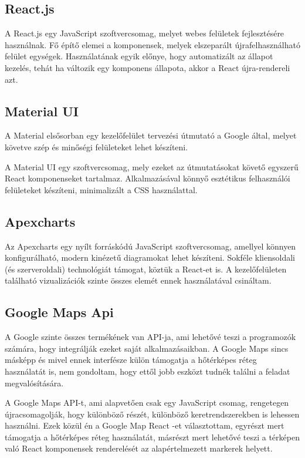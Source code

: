 \subsection{React.js}
A React.js \cite{react} egy JavaScript szoftvercsomag, melyet webes felületek fejlesztésére használnak.
Fő építő elemei a komponensek, melyek elszeparált újrafelhasználható felület egységek.
Használatának egyik előnye, hogy automatizált az állapot kezelés, tehát ha változik egy komponens állapota, akkor a React újra-rendereli azt.

\subsection{Material UI}
A Material \cite{material} elsősorban egy kezelőfelület tervezési útmutató a Google által, melyet követve szép és minőségi felületeket lehet készíteni.

A Material UI \cite{material-ui} egy szoftvercsomag, mely ezeket az útmutatásokat követő egyszerű React komponenseket tartalmaz.
Alkalmazásával könnyő esztétikus felhasználói felületeket készíteni, minimalizált a CSS használattal. 

\subsection{Apexcharts}
Az Apexcharts \cite{apexcharts} egy nyílt forráskódú JavaScript szoftvercsomag, amellyel könnyen konfigurálható, modern kinézetű diagramokat lehet készíteni.
Sokféle kliensoldali (és szerveroldali) technológiát támogat, köztük a React-et is. A kezelőfelületen található vizualizációk szinte összes elemét ennek használatával csináltam.

\subsection{Google Maps Api}
A Google szinte összes termékének van API-ja, ami lehetővé teszi a programozók számára, hogy integrálják ezeket saját alkalmazásaikban.
A Google Maps sincs másképp és mivel ennek interfésze külön támogatja a hőtérképes réteg használatát is, nem gondoltam, hogy ettől jobb eszközt tudnék találni a feladat megvalósítására.

A Google Maps API-t, ami alapvetően csak egy JavaScript csomag, rengetegen újracsomagolják, hogy különböző részét, különböző keretrendszerekben is lehessen használni.
Ezek közül én a Google Map React \cite{google-map-react}-et választottam, egyrészt mert támogatja a hőtérképes réteg használatát, 
másrészt mert lehetővé teszi a térképen való React komponensek renderelését az alapértelmezett markerek helyett.